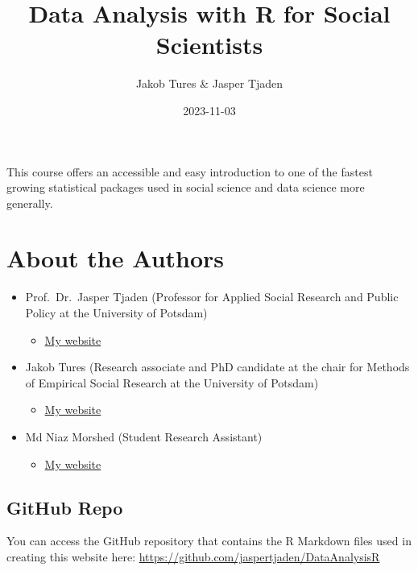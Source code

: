\documentclass[
]{book}
\title{Data Analysis with R for Social Scientists}
\author{Jakob Tures \& Jasper Tjaden}
\date{2023-11-03}
\providecommand{\tightlist}{%
  \setlength{\itemsep}{0pt}\setlength{\parskip}{0pt}}
\begin{document}
\maketitle

{
\setcounter{tocdepth}{1}
\tableofcontents
}
This course offers an accessible and easy introduction to one of the fastest growing statistical packages used in social science and data science more generally.

\hypertarget{about-the-authors}{%
\chapter*{About the Authors}\label{about-the-authors}}

\begin{itemize}
\tightlist
\item
  Prof.~Dr.~Jasper Tjaden (Professor for Applied Social Research and Public Policy at the University of Potsdam)

  \begin{itemize}
  \tightlist
  \item
    \href{https://jaspertjaden.com}{My website}
  \end{itemize}
\item
  Jakob Tures (Research associate and PhD candidate at the chair for Methods of Empirical Social Research at the University of Potsdam)

  \begin{itemize}
  \tightlist
  \item
    \href{https://www.uni-potsdam.de/de/soziologie-methoden/team/jakob-tures}{My website}
  \end{itemize}
\item
  Md Niaz Morshed (Student Research Assistant)

  \begin{itemize}
  \tightlist
  \item
    \href{https://n1az.github.io/}{My website}
  \end{itemize}
\end{itemize}

\hypertarget{github-repo}{%
\section*{GitHub Repo}\label{github-repo}}

You can access the GitHub repository that contains the R Markdown files used in creating this website here: \url{https://github.com/jaspertjaden/DataAnalysisR}
\end{document}
